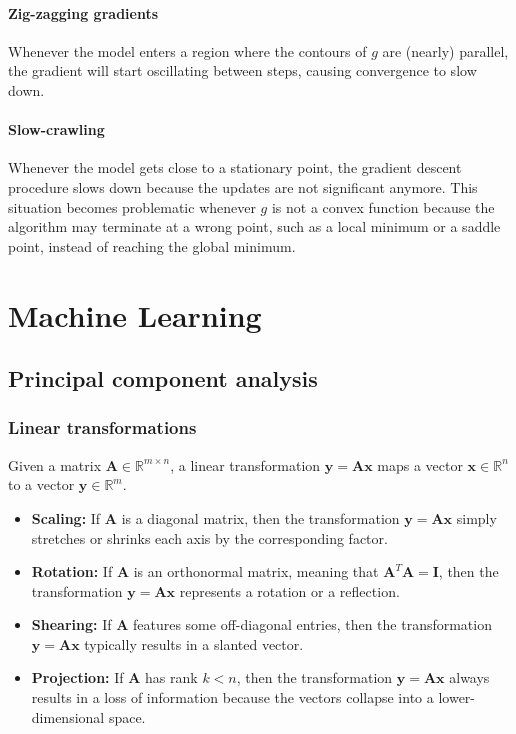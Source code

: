 \documentclass{report}
\begin{document}
\subsection{Zig-zagging gradients}
Whenever the model enters a region where the contours of $\displaystyle g$ are (nearly) parallel, the gradient will start oscillating between steps, causing convergence to slow down.
\subsection{Slow-crawling}
Whenever the model gets close to a stationary point, the gradient descent procedure slows down because the updates are not significant anymore. \newline
This situation becomes problematic whenever $\displaystyle g$ is not a convex function because the algorithm may terminate at a wrong point, such as a local minimum or a saddle point, instead of reaching the global minimum.

\part{Machine Learning}

\chapter{Principal component analysis}
\section{Linear transformations}
Given a matrix $\displaystyle \mathbf{A} \in \mathbb{R}^{m \times n}$, a linear transformation $\displaystyle \mathbf{y} = \mathbf{Ax}$ maps a vector $\displaystyle \mathbf{x} \in \mathbb{R}^n$ to a vector $\displaystyle \mathbf{y} \in \mathbb{R}^m$.
\begin{itemize}
    \item \textbf{Scaling: }If $\displaystyle \mathbf{A}$ is a diagonal matrix, then the transformation $\displaystyle \mathbf{y} = \mathbf{Ax}$ simply stretches or shrinks each axis by the corresponding factor.
    \item \textbf{Rotation: }If $\displaystyle \mathbf{A}$ is an orthonormal matrix, meaning that $\displaystyle \mathbf{A}^T\mathbf{A} = \mathbf{I}$, then the transformation $\displaystyle \mathbf{y} = \mathbf{Ax}$ represents a rotation or a reflection.
    \item \textbf{Shearing: }If $\displaystyle \mathbf{A}$ features some off-diagonal entries, then the transformation $\displaystyle \mathbf{y} = \mathbf{Ax}$ typically results in a slanted vector.
    \item \textbf{Projection: }If $\displaystyle \mathbf{A}$ has rank $\displaystyle k < n$, then the transformation $\displaystyle \mathbf{y} = \mathbf{Ax}$ always results in a loss of information because the vectors collapse into a lower-dimensional space.
\end{itemize}
\end{document}
